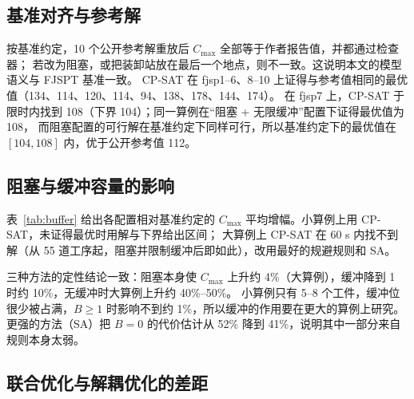 \documentclass[11pt,a4paper]{ctexart}
\theoremstyle{definition}
\theoremstyle{remark}
\begin{document}
\subsection{基准对齐与参考解}

按基准约定，10 个公开参考解重放后 $C_{\max}$ 全部等于作者报告值，并都通过检查器；
若改为阻塞，或把装卸站放在最后一个地点，则不一致。这说明本文的模型语义与 FJSPT 基准一致。
CP-SAT 在 fjsp1--6、8--10 上证得与参考值相同的最优值（134、114、120、114、94、138、178、144、174）。
在 fjsp7 上，CP-SAT 于限时内找到 108（下界 104）；同一算例在“阻塞 + 无限缓冲”配置下证得最优值为 108，
而阻塞配置的可行解在基准约定下同样可行，所以基准约定下的最优值在 $[104,108]$ 内，优于公开参考值 112。

\subsection{阻塞与缓冲容量的影响}

表~\ref{tab:buffer} 给出各配置相对基准约定的 $C_{\max}$ 平均增幅。小算例上用 CP-SAT，未证得最优时用解与下界给出区间；
大算例上 CP-SAT 在 60 s 内找不到解（从 55 道工序起，阻塞并限制缓冲后即如此），改用最好的规避规则和 SA。

\begin{table}[ht]
\centering
\caption{相对基准约定的 $C_{\max}$ 平均增幅}
\label{tab:buffer}
\small
{}
\end{table}

三种方法的定性结论一致：阻塞本身使 $C_{\max}$ 上升约 4\%（大算例），缓冲降到 1 时约 10\%，无缓冲时大算例上升约 40\%--50\%。
小算例只有 5--8 个工件，缓冲位很少被占满，$B\ge1$ 时影响不到约 1\%，所以缓冲的作用要在更大的算例上研究。
更强的方法（SA）把 $B=0$ 的代价估计从 52\% 降到 41\%，说明其中一部分来自规则本身太弱。

\subsection{联合优化与解耦优化的差距}
\end{document}

